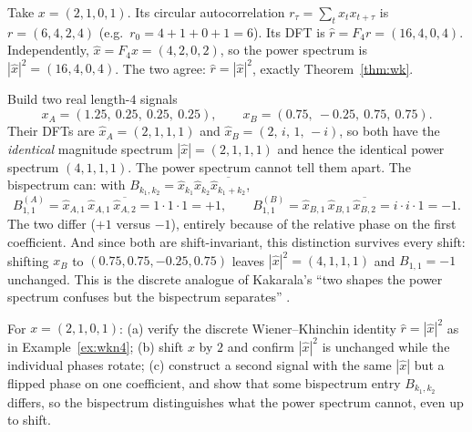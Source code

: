 \begin{example}
\label{ex:wkn4}
Take $x = (2,1,0,1)$. Its circular autocorrelation $r_\tau = \sum_t x_t x_{t+\tau}$ is
$r = (6,4,2,4)$ (e.g.\ $r_0 = 4+1+0+1 = 6$). Its DFT is $\widehat r = F_4 r =
(16,4,0,4)$. Independently, $\widehat x = F_4 x = (4,2,0,2)$, so the power spectrum is
$|\widehat x|^2 = (16,4,0,4)$. The two agree: $\widehat r = |\widehat x|^2$, exactly
Theorem~\ref{thm:wk}.
\end{example}

\begin{example}
\label{ex:bispecn4}
Build two real length-$4$ signals
\[
  x_A = (1.25,\ 0.25,\ 0.25,\ 0.25), \qquad
  x_B = (0.75,\ -0.25,\ 0.75,\ 0.75).
\]
Their DFTs are $\widehat{x}_A = (2,1,1,1)$ and $\widehat{x}_B = (2,\,i,\,1,\,-i)$, so
both have the \emph{identical} magnitude spectrum $|\widehat x| = (2,1,1,1)$ and hence
the identical power spectrum $(4,1,1,1)$. The power spectrum cannot tell them apart. The
bispectrum can: with $B_{k_1,k_2} = \widehat x_{k_1}\widehat x_{k_2}
\overline{\widehat x_{k_1+k_2}}$,
\[
  B^{(A)}_{1,1} = \widehat{x}_{A,1}\,\widehat{x}_{A,1}\,\overline{\widehat{x}_{A,2}}
               = 1\cdot 1 \cdot 1 = +1,
  \qquad
  B^{(B)}_{1,1} = \widehat{x}_{B,1}\,\widehat{x}_{B,1}\,\overline{\widehat{x}_{B,2}}
               = i\cdot i \cdot 1 = -1 .
\]
The two differ ($+1$ versus $-1$), entirely because of the relative phase on the first
coefficient. And since both are shift-invariant, this distinction survives every shift:
shifting $x_B$ to $(0.75,0.75,-0.25,0.75)$ leaves $|\widehat x|^2 = (4,1,1,1)$ and
$B_{1,1} = -1$ unchanged. This is the discrete analogue of Kakarala's ``two shapes the
power spectrum confuses but the bispectrum separates'' \citep{invariants_kakarala}.
\end{example}

\begin{problem}
\label{prob:bispec}
For $x = (2,1,0,1)$: (a) verify the discrete Wiener--Khinchin identity $\widehat r =
|\widehat x|^2$ as in Example~\ref{ex:wkn4}; (b) shift $x$ by $2$ and confirm
$|\widehat x|^2$ is unchanged while the individual phases rotate; (c) construct a second
signal with the same $|\widehat x|$ but a flipped phase on one coefficient, and show
that some bispectrum entry $B_{k_1,k_2}$ differs, so the bispectrum distinguishes
what the power spectrum cannot, even up to shift.
\end{problem}

